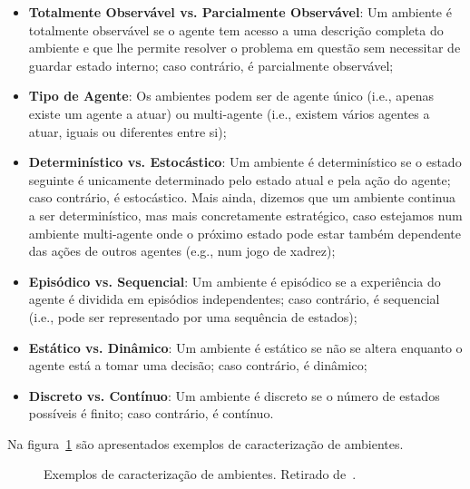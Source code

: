 \begin{itemize}
    \item \textbf{Totalmente Observável vs. Parcialmente Observável}: Um ambiente é totalmente observável se o agente tem acesso a uma descrição completa do ambiente e que lhe permite resolver o problema em questão sem necessitar de guardar estado interno; caso contrário, é parcialmente observável;
    \item \textbf{Tipo de Agente}: Os ambientes podem ser de agente único (i.e., apenas existe um agente a atuar) ou multi-agente (i.e., existem vários agentes a atuar, iguais ou diferentes entre si);
    \item \textbf{Determinístico vs. Estocástico}: Um ambiente é determinístico se o estado seguinte é unicamente determinado pelo estado atual e pela ação do agente; caso contrário, é estocástico.
    Mais ainda, dizemos que um ambiente continua a ser determinístico, mas mais concretamente estratégico, caso estejamos num ambiente multi-agente onde o próximo estado pode estar também dependente das ações de outros agentes (e.g., num jogo de xadrez);
    \item \textbf{Episódico vs. Sequencial}: Um ambiente é episódico se a experiência do agente é dividida em episódios independentes; caso contrário, é sequencial (i.e., pode ser representado por uma sequência de estados);
    \item \textbf{Estático vs. Dinâmico}: Um ambiente é estático se não se altera enquanto o agente está a tomar uma decisão; caso contrário, é dinâmico;
    \item \textbf{Discreto vs. Contínuo}: Um ambiente é discreto se o número de estados possíveis é finito; caso contrário, é contínuo.
\end{itemize}

Na figura~\ref{fig:ambientes-exemplos} são apresentados exemplos de caracterização de ambientes.

\begin{figure}[H]
    \begin{center}
    \end{center}
    \caption{Exemplos de caracterização de ambientes.
    Retirado de~\cite{ist:leic:resumos:agentes}.}\label{fig:ambientes-exemplos}
\end{figure}


